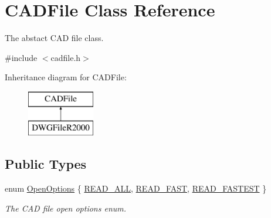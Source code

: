 \hypertarget{class_c_a_d_file}{}\section{C\+A\+D\+File Class Reference}
\label{class_c_a_d_file}


The abstact C\+AD file class.  




{\ttfamily \#include $<$cadfile.\+h$>$}

Inheritance diagram for C\+A\+D\+File\+:\begin{figure}[H]
\begin{center}
\leavevmode
\includegraphics[height=2.000000cm]{class_c_a_d_file}
\end{center}
\end{figure}
\subsection*{Public Types}
\begin{DoxyCompactItemize}
\item 
enum \hyperlink{class_c_a_d_file_a4776c7f9fc5888cac0ee6eede900db5a}{Open\+Options} \{ \hyperlink{class_c_a_d_file_a4776c7f9fc5888cac0ee6eede900db5aa31951f81322352b41b9969dfa90e8239}{R\+E\+A\+D\+\_\+\+A\+LL}, 
\hyperlink{class_c_a_d_file_a4776c7f9fc5888cac0ee6eede900db5aab28ae38caf2847fb4895de25acf5cbe7}{R\+E\+A\+D\+\_\+\+F\+A\+ST}, 
\hyperlink{class_c_a_d_file_a4776c7f9fc5888cac0ee6eede900db5aa0a071ae71397d2dcf724cf627e62ec65}{R\+E\+A\+D\+\_\+\+F\+A\+S\+T\+E\+ST}
 \}\begin{DoxyCompactList}\small\item\em The C\+AD file open options enum. \end{DoxyCompactList}
\end{DoxyCompactItemize}

